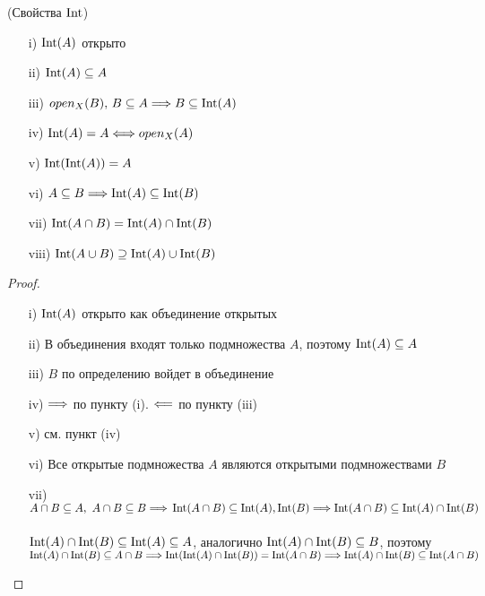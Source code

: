 \begin{theorem}(Свойства $\operatorname{Int}$)
    \enewline
    \begin{itemize}
        \item[i)] $\operatorname{Int}(A)$ открыто
        \item[ii)] $\operatorname{Int}(A) \subseteq A$
        \item[iii)] $open_X(B),\, B \subseteq A \Longrightarrow B \subseteq \operatorname{Int}(A)$
        \item[iv)] $\operatorname{Int}(A) = A \Longleftrightarrow open_X(A)$
        \item[v)] $\operatorname{Int}(\operatorname{Int}(A)) = A$
        \item[vi)] $A \subseteq B \Longrightarrow \operatorname{Int}(A) \subseteq \operatorname{Int}(B)$
        \item[vii)] $\operatorname{Int}(A \cap B) = \operatorname{Int}(A) \cap \operatorname{Int}(B)$
        \item[viii)] $\operatorname{Int}(A \cup B) \supseteq \operatorname{Int}(A) \cup \operatorname{Int}(B)$
    \end{itemize}
\end{theorem}
\begin{proof}
    \enewline
    \begin{itemize}
        \item[i)] $\operatorname{Int}(A)$ открыто как объединение открытых
        \item[ii)] В объединения входят только подмножества $A$, поэтому
        $\operatorname{Int}(A) \subseteq A$
        \item[iii)] $B$ по определению войдет в объединение
        \item[iv)] $\Longrightarrow$ по пункту (i). $\Longleftarrow$ по пункту (iii)
        \item[v)] см. пункт (iv)
        \item[vi)] Все открытые подмножества $A$ являются открытыми
        подмножествами $B$
        \item[vii)] $A \cap B \subseteq A,~ A \cap B \subseteq B \Longrightarrow \\
        \operatorname{Int}(A \cap B) \subseteq \operatorname{Int}(A), \operatorname{Int}(B) \Longrightarrow \operatorname{Int}(A \cap B) \subseteq
        \operatorname{Int}(A) \cap \operatorname{Int}(B)$ \\ \\
        $\operatorname{Int}(A) \cap \operatorname{Int}(B) \subseteq \operatorname{Int}(A) \subseteq A$, аналогично
        $\operatorname{Int}(A) \cap \operatorname{Int}(B) \subseteq B$, поэтому \\ $\operatorname{Int}(A) \cap \operatorname{Int}(B)
        \subseteq A \cap B \Longrightarrow \operatorname{Int}(\operatorname{Int}(A) \cap \operatorname{Int}(B)) = \operatorname{Int}(A \cap B) \Longrightarrow
        \operatorname{Int}(A) \cap \operatorname{Int}(B) \subseteq \operatorname{Int}(A \cap B)$
    \end{itemize}
\end{proof}

